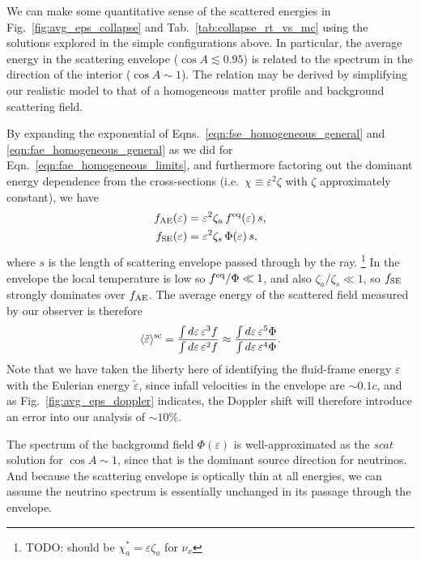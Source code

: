 \documentclass[aps,floatfix,prd,superscriptaddress,twocolumn]{revtex4-1}
\begin{document}
We can make some quantitative sense of the scattered energies in
Fig.~\ref{fig:avg_eps_collapse} and Tab.~\ref{tab:collapse_rt_vs_mc}
using the solutions explored in the simple configurations above.
In particular, the average energy in the scattering envelope
($\cos A\lesssim 0.95$) is related to the spectrum in the direction
of the interior ($\cos A \sim 1$).
The relation may be derived by simplifying our realistic model
to that of a homogeneous matter profile and background scattering field.

By expanding the exponential of
Eqns.~\ref{eqn:fse_homogeneous_general} and \ref{eqn:fae_homogeneous_general}
as we did for Eqn.~\ref{eqn:fae_homogeneous_limits},
and furthermore factoring out the dominant energy dependence from the
cross-sections (i.e.\ $\chi\equiv\varepsilon^2 \zeta$
with $\zeta$ approximately constant), we have
\begin{align}
  \label{eqn:fae_homogeneous_thin_limit}
  f_{\rm AE}(\varepsilon)
  &= \varepsilon^2 \zeta_a \,f^{\rm eq}(\varepsilon)\,s, \\
  \label{eqn:fse_homogeneous_thin_limit}
  f_{\rm SE}(\varepsilon)
  &= \varepsilon^2 \zeta_s \,\Phi(\varepsilon)\,s,
\end{align}
where $s$ is the length of scattering envelope passed through by the ray.
\footnote{TODO: should be $\chi_a^*=\varepsilon\zeta_a$ for $\nu_x$}
In the envelope the local temperature is low so $f^{\rm eq}/\Phi\ll 1$,
and also $\zeta_a/\zeta_s\ll 1$,
so $f_{\rm SE}$ strongly dominates over $f_{\rm AE}$.
The average energy of the scattered field measured by our observer
is therefore
\begin{equation}
  \label{eqn:avg_eps_sc}
  \langle \tilde{\varepsilon} \rangle^{\rm sc}
  = \frac{\int d\varepsilon\,\varepsilon^3 f}{\int d\varepsilon\,\varepsilon^2 f}
  \approx \frac{\int d\varepsilon\,\varepsilon^5 \Phi}{\int d\varepsilon\,\varepsilon^4 \Phi}.
\end{equation}
Note that we have taken the liberty here of identifying the fluid-frame energy
$\varepsilon$ with the Eulerian energy $\tilde{\varepsilon}$,
since infall velocities in the envelope are $\sim0.1c$,
and as Fig.~\ref{fig:avg_eps_doppler} indicates,
the Doppler shift will therefore introduce an error into our analysis of
$\sim10\%$.

The spectrum of the background field $\Phi(\varepsilon)$ is well-approximated
as the \emph{scat} solution for $\cos A\sim 1$, since that is the dominant
source direction for neutrinos.
And because the scattering envelope is optically thin at all energies,
we can assume the neutrino spectrum is essentially unchanged in its passage
through the envelope.
\end{document}
